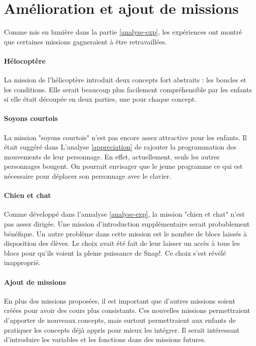 \section{Amélioration et ajout de missions}
Comme mis en lumière dans la partie \ref{analyse-exp}, les expériences ont montré que certaines missions gagneraient à être retravaillées.

\paragraph{Hélocoptère}
La mission de l'hélicoptère introduit deux concepts fort abstraits : les boucles et les conditions. Elle serait beaucoup plus facilement compréhensible par les enfants si elle était découpée en deux parties, une pour chaque concept.

\paragraph{Soyons courtois}
La mission "soyons courtois" n'est pas encore assez attractive pour les enfants. Il était suggéré dans L'analyse \ref{appreciation} de rajouter la programmation des mouvements de leur personnage. En effet, actuellement, seuls les autres personnages bougent. On pourrait envisager que le jeune programme ce qui est nécessaire pour déplacer son personnage avec le clavier.

\paragraph{Chien et chat}
Comme développé dans l'annalyse \ref{analyse-exp}, la mission "chien et chat" n'est pas assez dirigée. Une mission d'introduction supplémentaire serait probablement bénéfique. Un autre problème dans cette mission est le nombre de blocs laissés à disposition des élèves. Le choix avait été fait de leur laisser un accès à tous les blocs pour qu'ils voient la pleine puissance de Snap!. Ce choix s'est révélé inapproprié.

\paragraph{Ajout de missions}
En plus des missions proposées, il est important que d'autres missions soient créées pour avoir des cours plus consistants. Ces nouvelles missions permettraient d'apporter de nouveaux concepts, mais surtout permettraient aux enfants de pratiquer les concepts déjà appris pour mieux les intégrer. Il serait intéressant d'introduire les variables et les fonctions dans des missions futures.

